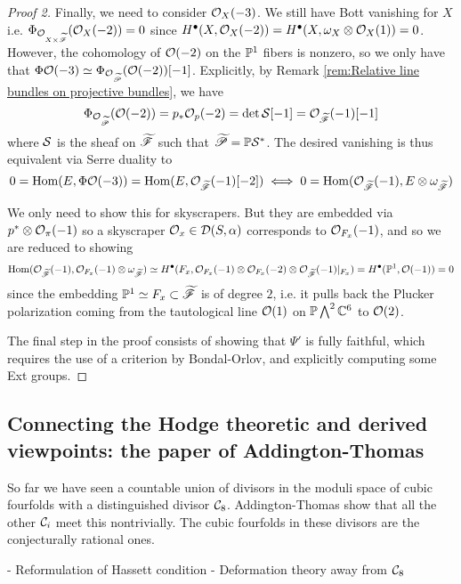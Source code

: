 \begin{proof}[Proof 2]
Finally, we need to consider $\O_X(-3)$. We still have Bott vanishing for $X$ i.e. $\Phi_{\O_{X\times \tscrF}}(\O_X(-2))=0$ since $H^\bullet(X, \O_X(-2))=H^\bullet(X, \omega_X \otimes \O_X(1))=0$. However, the cohomology of $\O(-2)$ on the $\P^1$ fibers is nonzero, so we only have that $\Phi \O(-3)\simeq \Phi_{\O_{\tscrP}}(\O(-2))[-1]$. Explicitly, by Remark \ref{rem:Relative line bundles on projective bundles}, we have 
$$\Phi_{\O_{\tscrP}}(\O(-2))=p_* \O_p(-2)= \det \calS[-1]=\O_{\tscrF} (-1)[-1]$$
where $\calS$ is the sheaf on $\tscrF$ such that $\tscrP = \P \calS^*$. The desired vanishing is thus equivalent via Serre duality to $$0 = \Hom(E, \Phi \O(-3))=\Hom(E, \O_{\tscrF} (-1)[-2])\iff 0=\Hom(\O_{\tscrF} (-1), E\otimes \omega_{\tscrF})$$

We only need to show this for skyscrapers. But they are embedded via $p^* \otimes \O_\pi(-1)$ so a skyscraper $\O_x \in \calD(S,\alpha)$ corresponds to $\O_{F_x}(-1)$, and so we are reduced to showing $$\Hom(\O_{\tscrF}(-1), \O_{F_x}(-1)\otimes\omega_{\tscrF})\simeq H^\bullet(F_x, \O_{F_x}(-1) \otimes \O_{F_x}(-2)\otimes \O_{\tscrF}(-1)|_{F_x})=H^\bullet(\P^1, \O(-1))=0$$since the embedding $\P^1 \simeq F_x \subset \tscrF$ is of degree $2$, i.e. it pulls back the Plucker polarization coming from the tautological line $\O(1)$ on $\P \bigwedge^2 \mathbb{C}^6$ to $\O(2)$.

The final step in the proof consists of showing that $\Psi'$ is fully faithful, which requires the use of a criterion by Bondal-Orlov, and explicitly computing some Ext groups. 

\end{proof}

\subsection{Connecting the Hodge theoretic and derived viewpoints: the paper of Addington-Thomas}

So far we have seen a countable union of divisors in the moduli space of cubic fourfolds with a distinguished divisor $\calC_8$. Addington-Thomas show that all the other $\calC_i$ meet this nontrivially. The cubic fourfolds in these divisors are the conjecturally rational ones. 

- Reformulation of Hassett condition
- Deformation theory away from $\calC_8$









